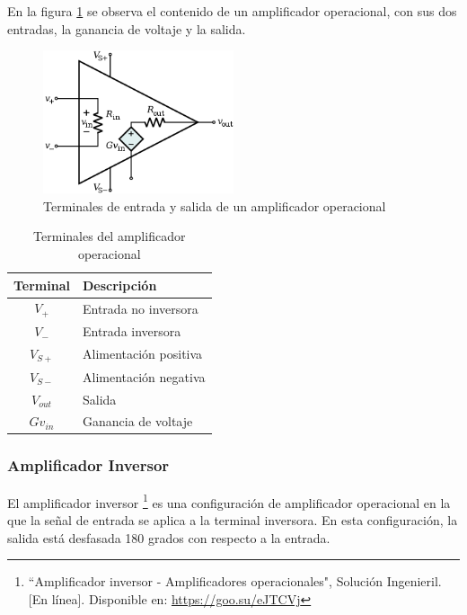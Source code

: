             En la figura \ref{fig:Amplificador_Operacional} se observa el contenido de un amplificador operacional, con sus dos entradas, la ganancia de voltaje y la salida.

            \begin{figure}[H]
                \centering
                \includegraphics[width=0.5\textwidth]{img/Marco/Amplificador_Operacional.png}
                \caption[Terminales de entrada y salida de un amplificador operacional]{Terminales de entrada y salida de un amplificador operacional\footnotemark}
                \label{fig:Amplificador_Operacional}
            \end{figure}

            \begin{table}[H]
                \centering
                \begin{tabular}{ c | l }
                    Terminal & Descripción \\ \hline
                    $V_+$ & Entrada no inversora \\
                    $V_-$ & Entrada inversora \\
                    $V_{S+}$ & Alimentación positiva \\
                    $V_{S-}$ & Alimentación negativa \\
                    $V_{out}$ & Salida \\
                    $Gv_{in}$ & Ganancia de voltaje \\
                \end{tabular}
                \caption{Terminales del amplificador operacional}
                \label{tab:terminales_amplificador}
            \end{table}

        \subsubsection{Amplificador Inversor}
            El amplificador inversor \footnote{``Amplificador inversor - Amplificadores operacionales", Solución Ingenieril. [En línea]. Disponible en: \url{https://goo.su/eJTCVj}} es una configuración de amplificador operacional en la que la señal de entrada se aplica a la terminal inversora. En esta configuración, la salida está desfasada 180 grados con respecto a la entrada.

